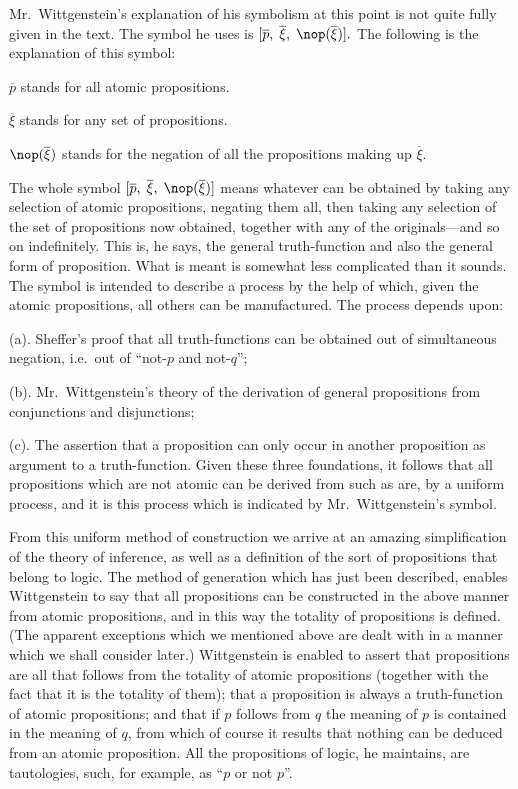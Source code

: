 Mr.\ Wittgenstein’s explanation of his symbolism at this point is not quite fully given in the text. The symbol he uses is $[\overline{p},\thickspace \overline{\xi},\thickspace \nop(\overline{\xi})].$ The following is the explanation of this symbol:

\begin{description}[noitemsep,labelindent=1em,leftmargin=3em,rightmargin=1em]
  \item $\overline{p}$ stands for all atomic propositions.
  \item $\overline{\xi}$ stands for any set of propositions.
  \item $\nop(\overline{\xi})$ stands for the negation of all the propositions making up $\overline{\xi}$.
\end{description}

The whole symbol $[\overline{p},\thickspace \overline{\xi},\thickspace \nop(\overline{\xi})]$ means whatever can be obtained by taking any selection of atomic propositions, negating them all, then taking any selection of the set of propositions now obtained, together with any of the originals—and so on indefinitely. This is, he says, the general truth-function and also the general form of proposition. What is meant is somewhat less complicated than it sounds. The symbol is intended to describe a process by the help of which, given the atomic propositions, all others can be manufactured. The process depends upon:

(a). Sheffer’s proof that all truth-functions can be obtained out of simultaneous negation, i.e.\ out of “not-$p$ and not-$q$”;

(b). Mr.\ Wittgenstein’s theory of the derivation of general propositions from conjunctions and disjunctions;

(c). The assertion that a proposition can only occur in another proposition as argument to a truth-function. Given these three foundations, it follows that all propositions which are not atomic can be derived from such as are, by a uniform process, and it is this process which is indicated by Mr.\ Wittgenstein’s symbol.

From this uniform method of construction we arrive at an amazing simplification of the theory of inference, as well as a definition of the sort of propositions that belong to logic. The method of generation which has just been described, enables Wittgenstein to say that all propositions can be constructed in the above manner from atomic propositions, and in this way the totality of propositions is defined. (The apparent exceptions which we mentioned above are dealt with in a manner which we shall consider later.) Wittgenstein is enabled to assert that propositions are all that follows from the totality of atomic propositions (together with the fact that it is the totality of them); that a proposition is always a truth-function of atomic propositions; and that if $p$ follows from $q$ the meaning of $p$ is contained in the meaning of $q$, from which of course it results that nothing can be deduced from an atomic proposition. All the propositions of logic, he maintains, are tautologies, such, for example, as “$p$ or not $p$”.

